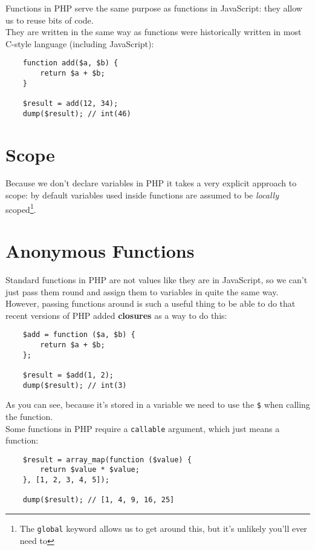 Functions in PHP serve the same purpose as functions in JavaScript: they allow us to reuse bits of code.
\\

They are written in the same way as functions were historically written in most C-style language (including JavaScript):

\begin{verbatim}
    function add($a, $b) {
        return $a + $b;
    }

    $result = add(12, 34);
    dump($result); // int(46)
\end{verbatim}


\section{Scope}

Because we don't declare variables in PHP it takes a very explicit approach to scope: by default variables used inside functions are assumed to be \textit{locally} scoped\footnote{The \texttt{global} keyword allows us to get around this, but it's unlikely you'll ever need to}.

\section{Anonymous Functions}

Standard functions in PHP are not values like they are in JavaScript, so we can't just pass them round and assign them to variables in quite the same way. However, passing functions around is such a useful thing to be able to do that recent versions of PHP added \textbf{closures} as a way to do this:

\begin{verbatim}
    $add = function ($a, $b) {
        return $a + $b;
    };

    $result = $add(1, 2);
    dump($result); // int(3)
\end{verbatim}

As you can see, because it's stored in a variable we need to use the \texttt{\$} when calling the function.
\\

Some functions in PHP require a \texttt{callable} argument, which just means a function:

\begin{verbatim}
    $result = array_map(function ($value) {
        return $value * $value;
    }, [1, 2, 3, 4, 5]);

    dump($result); // [1, 4, 9, 16, 25]
\end{verbatim}

